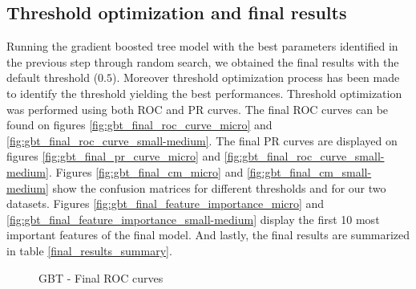 \documentclass[LaM,binding=0.6cm, english]{sapthesis}
\begin{document}
\subsection{Threshold optimization and final results}

Running the gradient boosted tree model with the best parameters identified in the previous step through random search, we obtained the final results with the default threshold ($0.5$). Moreover threshold optimization process has been made to identify the threshold yielding the best performances. Threshold optimization was performed using both ROC and PR curves. The final ROC curves can be found on figures \ref{fig:gbt_final_roc_curve_micro} and \ref{fig:gbt_final_roc_curve_small-medium}. The final PR curves are displayed on figures \ref{fig:gbt_final_pr_curve_micro} and \ref{fig:gbt_final_roc_curve_small-medium}. Figures \ref{fig:gbt_final_cm_micro} and \ref{fig:gbt_final_cm_small-medium} show the confusion matrices for different thresholds and for our two datasets. Figures \ref{fig:gbt_final_feature_importance_micro} and \ref{fig:gbt_final_feature_importance_small-medium} display the first 10 most important features of the final model. And lastly, the final results are summarized in table \ref{final_results_summary}.

\begin{figure}[!ht]
  \centering
  \hfill
  \caption{GBT - Final ROC curves}
\end{figure}
\end{document}
